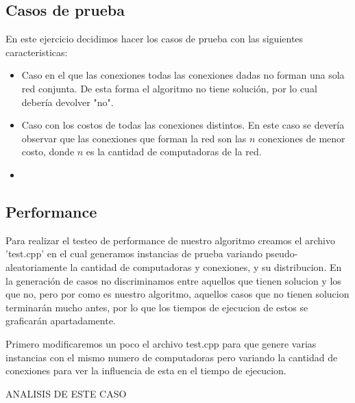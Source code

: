 \newpage


\subsection{Casos de prueba}

En este ejercicio decidimos hacer los casos de prueba con las siguientes caracteristicas:

\begin{itemize}
\item Caso en el que las conexiones todas las conexiones dadas no forman una sola red conjunta. De esta forma el algoritmo no tiene solución, por lo cual debería devolver "no".
\item Caso con los costos de todas las conexiones distintos. En este caso se devería observar que las conexiones que forman la red son las $n$ conexiones de menor costo, donde $n$ es la cantidad de computadoras de la red.
\item 
\end{itemize}


\newpage


\subsection{Performance}

Para realizar el testeo de performance de nuestro algoritmo creamos el archivo 'test.cpp' en el cual generamos instancias de prueba variando pseudo-aleatoriamente la cantidad de computadoras y conexiones, y su distribucion.
En la generación de casos no discriminamos entre aquellos que tienen solucion y los que no, pero por como es nuestro algoritmo, aquellos casos que no tienen solucion terminarán mucho antes, por lo que los tiempos de ejecucion de estos se graficarán apartadamente.

Primero modificaremos un poco el archivo test.cpp para que genere varias instancias con el mismo numero de computadoras pero variando la cantidad de conexiones para ver la influencia de esta en el tiempo de ejecucion.

ANALISIS DE ESTE CASO




